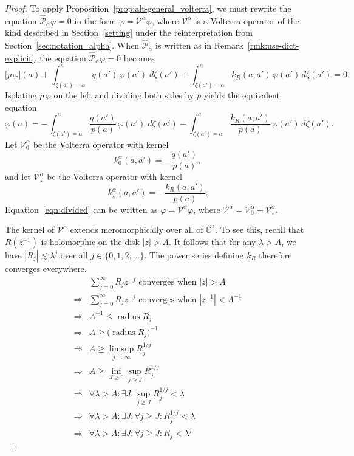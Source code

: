 \documentclass[final]{siamart220329}
\newcommand{\C}{\mathbb{C}}
\newcommand{\volterra}{\mathcal{V}}
\newcommand{\hardpart}{\mathcal{V}_0}
\newcommand{\softpart}{\mathcal{V}_\star}
\newcommand{\hardker}{k_0}
\newcommand{\softker}{k_\star}
\newenvironment{verify}{\color{veriforest}}{\color{black}}
\newenvironment{revtwo}{\color{revred}}{\color{black}}
\newenvironment{revtwo}{}{}
\begin{document}
\begin{proof}
To apply Proposition~\ref{prop:alt-general_volterra}, we must rewrite the equation $\hat{\mathcal{P}}_{\alpha}\varphi = 0$ in the form $\varphi = \volterra^\alpha \varphi$, where $\volterra^\alpha$ is a Volterra operator of the kind described in Section~\ref{setting} under the reinterpretation from Section~\ref{sec:notation_alpha}. When $\hat{\mathcal{P}}_\alpha$ is written as in Remark~\ref{rmk:use-dict-explicit}, the equation $\hat{\mathcal{P}}_{\alpha} \varphi = 0$ becomes
\begin{revtwo}
\[ \big[ p\, \varphi \big](a) + \int_{\zeta(a')=\alpha}^a q(a') \, \varphi(a') \; d\zeta(a') + \int_{\zeta(a')=\alpha}^a k_R(a, a') \, \varphi(a') \, d\zeta(a') = 0. \]
\end{revtwo}
Isolating $p\,\varphi$ on the left and dividing both sides by $p$ yields the equivalent equation
\begin{revtwo}
\begin{equation}\label{eqn:divided}
\varphi(a) = -\int_{\zeta(a')=\alpha}^a \frac{q(a')}{p(a)} \, \varphi(a') \; d\zeta(a') - \int_{\zeta(a')=\alpha}^a \frac{k_R(a, a')}{p(a)} \, \varphi(a') \, d\zeta(a').
\end{equation}
\end{revtwo}
Let $\hardpart^\alpha$ be the Volterra operator with kernel
\[ \hardker^\alpha(a,a') = -\frac{q(a')}{p(a)}, \]
and let $\softpart^\alpha$ be the Volterra operator with kernel
\[ \softker^\alpha(a,a') = -\frac{k_R(a,a')}{p(a)}. \]
Equation~\eqref{eqn:divided} can be written as $\varphi = \volterra^\alpha \varphi$, where $\volterra^\alpha = \hardpart^\alpha + \softpart^\alpha$.

The kernel of $\volterra^\alpha$ extends meromorphically over all of $\C^2$. To see this, recall that $R(z^{-1})$ is holomorphic on the disk $|z| > A$. It follows that for any $\lambda > A$, we have $|R_j| \lesssim \lambda^j$ over all $j \in \{0, 1, 2, \ldots\}$. The power series defining $k_R$ therefore converges everywhere.
\begin{verify}
\begin{align*}
& \sum_{j = 0}^\infty R_j z^{-j} \text{ converges when } |z| > A \\
\Longrightarrow & \sum_{j = 0}^\infty R_j z^{-j} \text{ converges when } |z^{-1}| < A^{-1} \\
\Longrightarrow & A^{-1} \le \operatorname{radius} R_j \\
\Longrightarrow & A \ge \big(\operatorname{radius} R_j\big)^{-1} \\
\Longrightarrow & A \ge \limsup_{j \to \infty} R_j^{1/j} \\
\Longrightarrow & A \ge \inf_{J \ge 0} \sup_{j \ge J} R_j^{1/j} \\
\Longrightarrow & \forall \lambda > A: \exists J: \sup_{j \ge J} R_j^{1/j} < \lambda \\
\Longrightarrow & \forall \lambda > A: \exists J: \forall j \ge J: R_j^{1/j} < \lambda \\
\Longrightarrow & \forall \lambda > A: \exists J: \forall j \ge J: R_j < \lambda^j
\end{align*}
\end{verify}


\end{proof}
\end{document}
